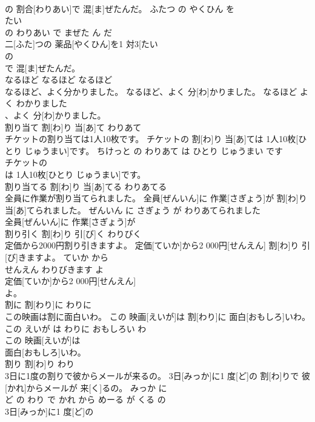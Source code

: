 \documentclass[8pt]{extreport}
\begin{document}
\begin{CJK}{UTF8}{min}
\\	の 割合[わりあい]で 混[ま]ぜたんだ。	ふたつ の やくひん を 
\\	たい 
\\	の わりあい で まぜた ん だ	
\\	二[ふた]つの 薬品[やくひん]を1 対3[たい 
\\	の
\\	で 混[ま]ぜたんだ。			
\\	なるほど	なるほど	なるほど	
\\	なるほど、よく分かりました。	なるほど、よく 分[わ]かりました。	なるほど よく わかりました	
\\	、よく 分[わ]かりました。			
\\	割り当て	割[わ]り 当[あ]て	わりあて	
\\	チケットの割り当ては1人10枚です。	チケットの 割[わ]り 当[あ]ては 1人10枚[ひとり じゅうまい]です。	ちけっと の わりあて は ひとり じゅうまい です	
\\	チケットの
\\	は 1人10枚[ひとり じゅうまい]です。			
\\	割り当てる	割[わ]り 当[あ]てる	わりあてる	
\\	全員に作業が割り当てられました。	全員[ぜんいん]に 作業[さぎょう]が 割[わ]り 当[あ]てられました。	ぜんいん に さぎょう が わりあてられました	
\\	全員[ぜんいん]に 作業[さぎょう]が
\\	割り引く	割[わ]り 引[び]く	わりびく	
\\	定価から2000円割り引きますよ。	定価[ていか]から2 000円[せんえん] 割[わ]り 引[び]きますよ。	ていか から 
\\	せんえん わりびきます よ	
\\	定価[ていか]から2 000円[せんえん]
\\	よ。			
\\	割に	割[わり]に	わりに	
\\	この映画は割に面白いわ。	この 映画[えいが]は 割[わり]に 面白[おもしろ]いわ。	この えいが は わりに おもしろい わ	
\\	この 映画[えいが]は
\\	面白[おもしろ]いわ。			
\\	割り	割[わ]り	わり	
\\	3日に1度の割りで彼からメールが来るの。	3日[みっか]に1 度[ど]の 割[わ]りで 彼[かれ]からメールが 来[く]るの。	みっか に 
\\	ど の わり で かれ から めーる が くる の	
\\	3日[みっか]に1 度[ど]の

\end{CJK}
\end{document}

